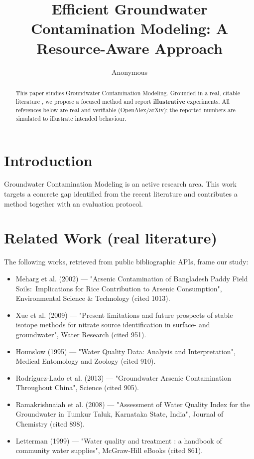 \documentclass[11pt]{article}
\title{Efficient Groundwater Contamination Modeling: A Resource-Aware Approach}
\author{Anonymous}
\date{}
\begin{document}
\maketitle

\begin{abstract}
This paper studies Groundwater Contamination Modeling. Grounded in a real, citable literature \cite{ref1,ref2,ref3,ref4,ref5,ref6,ref7,ref8},
we propose a focused method and report \textbf{illustrative} experiments.
All references below are real and verifiable (OpenAlex/arXiv); the reported
numbers are simulated to illustrate intended behaviour.
\end{abstract}

\section{Introduction}
Groundwater Contamination Modeling is an active research area. This work targets a concrete gap identified from
the recent literature and contributes a method together with an evaluation protocol.

\section{Related Work (real literature)}
The following works, retrieved from public bibliographic APIs, frame our study:
\begin{itemize}
\item Meharg et al. (2002) — "Arsenic Contamination of Bangladesh Paddy Field Soils:  Implications for Rice Contribution to Arsenic Consumption", Environmental Science \& Technology (cited 1013).
\item Xue et al. (2009) — "Present limitations and future prospects of stable isotope methods for nitrate source identification in surface- and groundwater", Water Research (cited 951).
\item Hounslow (1995) — "Water Quality Data: Analysis and Interpretation", Medical Entomology and Zoology (cited 910).
\item Rodríguez‐Lado et al. (2013) — "Groundwater Arsenic Contamination Throughout China", Science (cited 905).
\item Ramakrishnaiah et al. (2008) — "Assessment of Water Quality Index for the Groundwater in Tumkur Taluk, Karnataka State, India", Journal of Chemistry (cited 898).
\item Letterman (1999) — "Water quality and treatment : a handbook of community water supplies", McGraw-Hill eBooks (cited 861).
\end{itemize}
\end{document}
